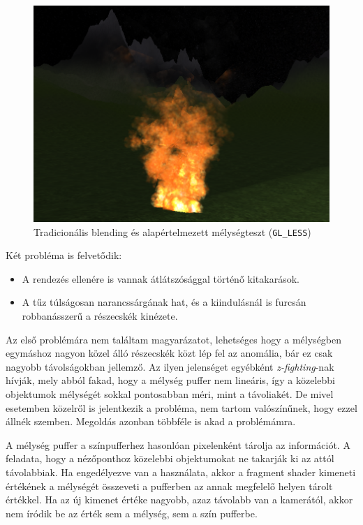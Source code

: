 \begin{figure}[h]
 \centering
 \includegraphics[width=\textwidth]{kepek/particleFireBasic1.png}
 \caption{Tradicionális blending és alapértelmezett mélységteszt (\texttt{GL\_LESS})}
 \label{fig:particleFireBasic1}
\end{figure}

Két probléma is felvetődik: 
\begin{itemize}
\item A rendezés ellenére is vannak átlátszósággal történő kitakarások.
\item A tűz túlságosan narancssárgának hat, és a kiindulásnál is furcsán robbanásszerű a részecskék kinézete.
\end{itemize}

Az első problémára nem találtam magyarázatot, lehetséges hogy a mélységben egymáshoz nagyon közel álló részecskék közt lép fel az anomália, bár ez csak nagyobb távolságokban jellemző. Az ilyen jelenséget egyébként \textit{z-fighting}-nak hívják, mely abból fakad, hogy a mélység puffer nem lineáris, így a közelebbi objektumok mélységét sokkal pontosabban méri, mint a távoliakét. De mivel esetemben közelről is jelentkezik a probléma, nem tartom valószínűnek, hogy ezzel állnék szemben. Megoldás azonban többféle is akad a problémámra.

A mélység puffer a színpufferhez hasonlóan pixelenként tárolja az információt. A feladata, hogy a nézőponthoz közelebbi objektumokat ne takarják ki az attól távolabbiak. Ha engedélyezve van a használata, akkor a fragment shader kimeneti értékének a mélységét összeveti a pufferben az annak megfelelő helyen tárolt értékkel. Ha az új kimenet értéke nagyobb, azaz távolabb van a kamerától, akkor nem íródik be az érték sem a mélység, sem a szín pufferbe. 

